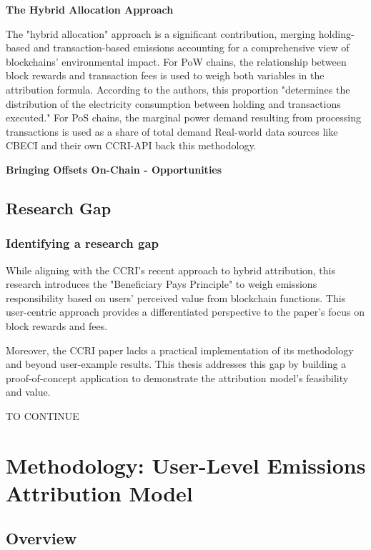 \documentclass[11pt]{report}
\begin{document}
\textbf{The Hybrid Allocation Approach}

The "hybrid allocation" approach is a significant contribution, merging holding-based and transaction-based emissions accounting for a comprehensive view of blockchains' environmental impact. For PoW chains, the relationship between block rewards and transaction fees is used to weigh both variables in the attribution formula. According to the authors, this proportion "determines the distribution of the electricity consumption between holding and transactions executed." For PoS chains, the marginal power demand resulting from processing transactions is used as a share of total demand Real-world data sources like CBECI and their own CCRI-API back this methodology.


\textbf{Bringing Offsets On-Chain - Opportunities}






\section{Research Gap}

\subsection{Identifying a research gap}

While aligning with the CCRI's recent approach to hybrid attribution, this research introduces the "Beneficiary Pays Principle" to weigh emissions responsibility based on users' perceived value from blockchain functions. This user-centric approach provides a differentiated perspective to the paper's focus on block rewards and fees.

Moreover, the CCRI paper lacks a practical implementation of its methodology and beyond user-example results. This thesis addresses this gap by building a proof-of-concept application to demonstrate the attribution model's feasibility and value.

    {\large{TO CONTINUE}} 

\chapter{Methodology: User-Level Emissions Attribution Model}
\section{Overview \label{se:methodology_overview}}
\end{document}
